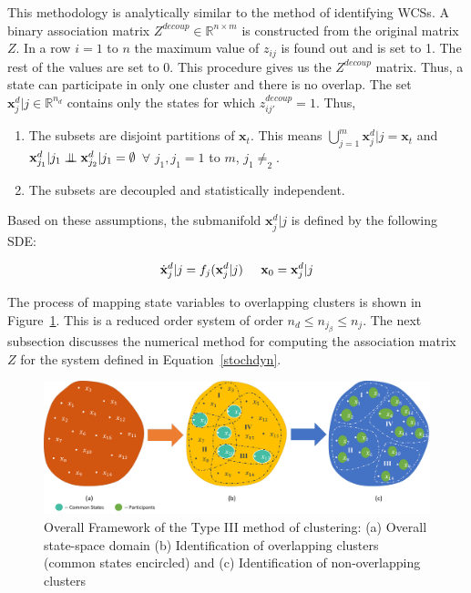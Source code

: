 This methodology is analytically similar to the method of identifying WCSs. A binary association matrix $Z^{decoup} \in \mathbb{R}^{n \times m}$ is constructed from the original matrix $Z$. In a row $i = 1$ to $n$ the maximum value of $z_{ij}$  is found out and is set to 1. The rest of the values are set to 0. This procedure gives us the $Z^{decoup}$ matrix. Thus, a state can participate in only one cluster and there is no overlap. The set $\textbf{x}^d_j|j \in \mathbb{R}^{n_d}$ contains only the states for which $z_{ij'}^{decoup} = 1$. Thus,
\begin{enumerate}
\item The subsets are disjoint partitions of $\textbf{x}_t$. This means $\bigcup _{j=1}^m \textbf{x}^d_j|j =\textbf{x}_t$ and $\textbf{x}^d_{j_1}|j_1 \mathrel{\perp\mspace{-10mu}\perp} \textbf{x}^d_{j_2}|j_1 = \emptyset$ $\forall$ $j_1, j_1 = 1$ to $m$, $j_1 \neq _2$. 
\item The subsets are decoupled and statistically independent. 
\end{enumerate}
Based on these assumptions, the submanifold $\textbf{x}_j^{d}|j$ is defined by the following SDE:

\begin{equation}
\dot{\textbf{x}}_j^{d}|j = f_j({\textbf{x}}_j^{d}|j)    \hspace{5 mm}  \textbf{x}_0 = {\textbf{x}}_j^{d}|j 
\end{equation}

The process of mapping state variables to overlapping clusters is shown in Figure~\ref{framework_TypeIII}. This is a reduced order system of order $n_d \leq n_{j_\beta} \leq n_j$. The next subsection discusses the numerical method for computing the association matrix $Z$ for the system defined in Equation~\ref{stochdyn}. 


\begin{figure}[H]
\begin{center}
\includegraphics[width=\textwidth]{figures_2/TypeIII}
\caption{Overall Framework of the Type III method of clustering: (a) Overall state-space domain (b) Identification of overlapping clusters (common states encircled) and (c) Identification of non-overlapping clusters}
\label{framework_TypeIII}
\end{center}
\end{figure}


